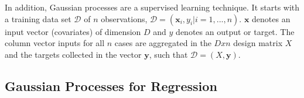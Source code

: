 \documentclass[12pt,a4paper]{report}
\theoremstyle{definition}
\begin{document}
In addition, Gaussian processes are a supervised learning technique. 
It starts with a training data set $\mathcal{D}$ of $n$ observations, $\mathcal{D} = (\textbf{x}_{i}, y_{i} | i = 1, ..., n)$.
$\textbf{x}$ denotes an input vector (covariates) of dimension $D$ and $y$ denotes an output or target. 
The column vector inputs for all $n$ cases are aggregated in the $D x n$ design matrix $X$ and the targets collected in the vector $\textbf{y}$, such that $\mathcal{D} = (X, \textbf{y})$.

\subsection{Gaussian Processes for Regression}



%




\end{document}
